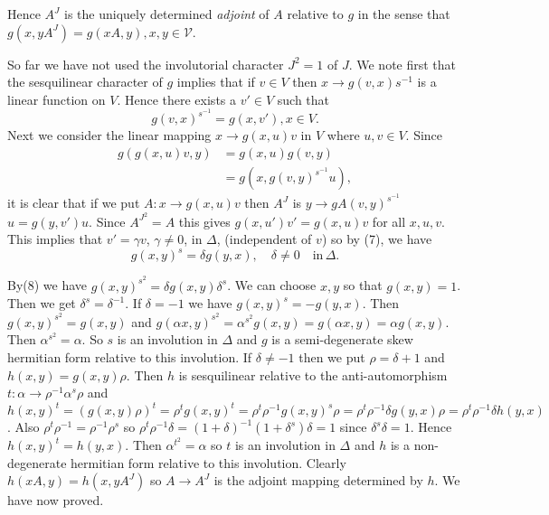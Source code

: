 \begin{enumerate}[I.]
Hence $A^{J}$ is the uniquely determined {\em adjoint} of $A$ relative to $g$ in the sense that $g(x,y A^{J})=g(xA,y), x,y\in \mathcal{V}$.

So far we have not used the involutorial character $J^{2}=1$ of $J$. We note first that the sesquilinear character of $g$ implies that if $v\in V$ then $x\to g(v, x)s^{-1}$ is a linear function on $V$.
Hence there exists a $v'\in V$ such that
\begin{equation*}
g(v, x)^{s^{-1}}=g(x,v'),x\in V.\tag{7}\label{c0:eq7}
\end{equation*}
Next we consider the linear mapping $x\to g(x,u)v$ in $V$ where $u,v\in V$. Since
\begin{align*}
g(g(x,u)v,y)&=g(x,u)g(v,y)\\
&=g(x,g(v,y)^{s^{-1}}u),
\end{align*}
it is clear that if we put $A:x\to g(x,u)v$ then $A^{J}$ is $y\to
gA(v,y)^{s^{-1}}$ $u=g(y,v')u$. Since $A^{J^{2}}=A$ this gives
$g(x,u')v'=g(x,u)v$ for all $x,u,v$. This implies that $v'=\gamma v$,
$\gamma\neq 0$, in $\Delta$, (independent of $v$) so by (7), we have 
\begin{equation*}
g(x,y)^{s}=\delta g(y,x),\quad \delta\neq
0\quad \text{in}\, \Delta. \tag{8}\label{c0:eq8} 
\end{equation*}

By\pageoriginale (8) we have $g(x,y)^{s^{2}}=\delta g(x,y)\delta^{s}$. We can choose $x,y$ so that $g(x,y)=1$. Then we get $\delta^{s}=\delta^{-1}$. If $\delta=-1$ we have $g(x,y)^{s}=-g(y,x)$. Then $g(x,y)^{s^{2}}=g(x,y)$ and $g(\alpha x,y)^{s^{2}}=\alpha^{s^{2}}g(x,y)=g(\alpha x,y)=\alpha g(x,y)$. Then $\alpha^{s^{2}}=\alpha$. So $s$ is an involution in $\Delta$ and $g$ is a  semi-degenerate skew hermitian form relative to this involution. If $\delta\neq-1$ then we put $\rho=\delta+1$ and $h(x,y)=g(x,y)\rho$. Then $h$ is sesquilinear relative to the anti-automorphism $t:\alpha \to \rho^{-1}\alpha^{s}\rho$ and $h(x,y)^{t}=(g(x,y)\rho)^{t}=\rho^{t}g(x,y)^{t}=\rho^{t}\rho^{-1}g(x,y)^{s}\rho=\rho^{t}\rho^{-1}\delta g(y,x)\rho=\rho^{t}\rho^{-1}\delta h(y,x)$. Also $\rho^{t}\rho^{-1}=\rho^{-1}\rho^{s}$ so $\rho^{t}\rho^{-1}\delta=(1+\delta)^{-1}(1+\delta^{s})\delta=1$ since $\delta^{s}\delta=1$. Hence $h(x,y)^{t}=h(y,x)$. Then $\alpha^{t^{2}}=\alpha$ so $t$ is an involution in $\Delta$ and $h$ is a non-degenerate hermitian form relative to this involution. Clearly $h(xA,y)=h(x,y A^{J})$ so $A\to A^{J}$ is the adjoint mapping determined by $h$. We have now proved.


\end{enumerate}
